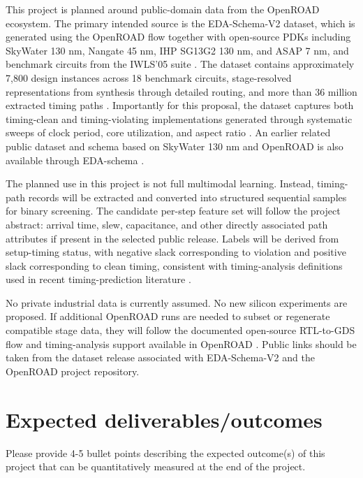 \documentclass[12pt,a4paper]{article}
\begin{document}
This project is planned around public-domain data from the OpenROAD ecosystem. The primary intended source is the EDA-Schema-V2 dataset, which is generated using the OpenROAD flow together with open-source PDKs including SkyWater 130 nm, Nangate 45 nm, IHP SG13G2 130 nm, and ASAP 7 nm, and benchmark circuits from the IWLS'05 suite \cite{Shrestha2026EDASchemaV2}. The dataset contains approximately 7,800 design instances across 18 benchmark circuits, stage-resolved representations from synthesis through detailed routing, and more than 36 million extracted timing paths \cite{Shrestha2026EDASchemaV2}. Importantly for this proposal, the dataset captures both timing-clean and timing-violating implementations generated through systematic sweeps of clock period, core utilization, and aspect ratio \cite{Shrestha2026EDASchemaV2}. An earlier related public dataset and schema based on SkyWater 130 nm and OpenROAD is also available through EDA-schema \cite{Shrestha2024EDASchema}.

The planned use in this project is not full multimodal learning. Instead, timing-path records will be extracted and converted into structured sequential samples for binary screening. The candidate per-step feature set will follow the project abstract: arrival time, slew, capacitance, and other directly associated path attributes if present in the selected public release. Labels will be derived from setup-timing status, with negative slack corresponding to violation and positive slack corresponding to clean timing, consistent with timing-analysis definitions used in recent timing-prediction literature \cite{Li2025GATSlack}.

No private industrial data is currently assumed. No new silicon experiments are proposed. If additional OpenROAD runs are needed to subset or regenerate compatible stage data, they will follow the documented open-source RTL-to-GDS flow and timing-analysis support available in OpenROAD \cite{Ajayi2019OpenROAD,Reda2020OpenROADFlow}. Public links should be taken from the dataset release associated with EDA-Schema-V2 and the OpenROAD project repository.

\section{Expected deliverables/outcomes}
Please provide 4-5 bullet points describing the expected outcome(s) of this project that can be quantitatively measured at the end of the project. 
\end{document}
